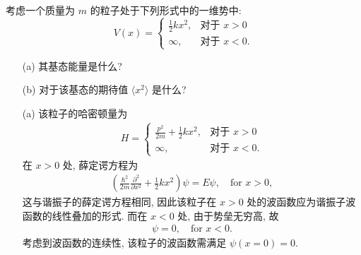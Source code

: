 \documentclass{assignment}
\begin{document}
\begin{prob}[课本习题 2.22]
    考虑一个质量为 $m$ 的粒子处于下列形式中的一维势中:
    \[
        V(x)=\left\{\begin{array}{ll}
            \frac{1}{2}kx^2,&\text{对于 }x>0\\
            \infty,&\text{对于 }x<0.
        \end{array}\right.
    \]
    \begin{itemize}
        \item[(a)] 其基态能量是什么?
        \item[(b)] 对于该基态的期待值 $\langle x^2\rangle$ 是什么?
    \end{itemize}
\end{prob}
\begin{sol}
    \begin{itemize}
        \item[(a)] 该粒子的哈密顿量为
        \begin{align}
            H=\left\{\begin{array}{ll}
                \frac{p^2}{2m}+\frac{1}{2}kx^2,&\text{对于 }x>0\\
                \infty,&\text{对于 }x<0.
            \end{array}\right.
        \end{align}
        在 $x>0$ 处, 薛定谔方程为
        \begin{align}
            \left(\frac{\hbar^2}{2m}\frac{\partial^2}{\partial x^2}+\frac{1}{2}kx^2\right)\psi=E\psi,\quad\text{for }x>0,
        \end{align}
        这与谐振子的薛定谔方程相同, 因此该粒子在 $x>0$ 处的波函数应为谐振子波函数的线性叠加的形式.
        而在 $x<0$ 处, 由于势垒无穷高, 故
        \begin{align}
            \psi=0,\quad\text{for }x<0.
        \end{align}
        考虑到波函数的连续性, 该粒子的波函数需满足 $\psi(x=0)=0$.


\end{itemize}
\end{sol}
\end{document}

